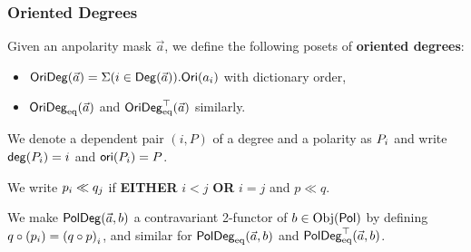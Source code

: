 \documentclass[a4paper]{memoir}
\begin{document}
\subsubsection{Oriented Degrees}\begin{definition}
	Given an anpolarity mask $\vec a$, we define the following posets of \textbf{oriented degrees}:
	\begin{itemize}
		\item $\orideg(\vec a) = \Sigma(i \in \Deg(\vec a)).\orisymbol(a_i)$ with dictionary order,
		\item $\oridegeq(\vec a)$ and $\oridegeqtop(\vec a)$ similarly.
	\end{itemize}
	We denote a dependent pair $(i, P)$ of a degree and a polarity as $\odeg P i$ and write $\getdeg(\odeg P i) = i$ and $\getori(\odeg P i) = P$.
	
	We write $\dpol i p \ll \dpol j q$ if \textbf{EITHER} $i < j$ \textbf{OR} $i = j$ and $p \ll q$.
	
	We make $\poldeg(\vec a, b)$ a contravariant 2-functor of $b \in \Obj(\polsymbol)$ by defining $q \circ (\dpol i p) = \dpol i {(q \circ p)}$, and similar for $\poldegeq(\vec a, b)$ and $\poldegeqtop(\vec a, b)$.
\end{definition}
\end{document}
